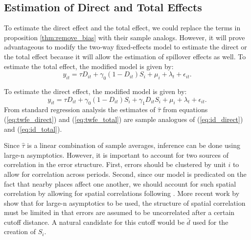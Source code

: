 \documentclass[11pt]{article}
\begin{document}
\subsection{Estimation of Direct and Total Effects}

To estimate the direct effect and the total effect, we could replace the terms in proposition \ref{thm:remove_bias} with their sample analogs. However, it will prove advantageous to modify the two-way fixed-effects model to estimate the direct or the total effect because it will allow the estimation of spillover effects as well. To estimate the total effect, the modified model is given by: 
\begin{equation}\label{eq:twfe_total}    
    y_{it} = \tau D_{it} + \gamma_{0} (1-D_{it}) S_{i} + \mu_i + \lambda_t + \epsilon_{it}.
\end{equation}

To estimate the direct effect, the modified model is given by:
\begin{equation}\label{eq:twfe_direct}    
    y_{it} = \tau D_{it} + \gamma_0 (1-D_{it}) S_{i} + \gamma_1 D_{it} S_{i} +  \mu_i + \lambda_t + \epsilon_{it}.
\end{equation}
From standard regression analysis the estimates of $\hat{\tau}$ from equations (\ref{eq:twfe_direct}) and (\ref{eq:twfe_total}) are sample analogues of (\ref{eq:id_direct}) and (\ref{eq:id_total}).

Since $\hat{\tau}$ is a linear combination of sample averages, inference can be done using large-n asymptotics. However, it is important to account for two sources of correlation in the error structure. First, errors should be clustered by unit $i$ to allow for correlation across periods. Second, since our model is predicated on the fact that nearby places affect one another, we should account for such spatial correlation by allowing for spatial correlations following \citet{Conley_1999}. More recent work by \citet{Ferman_2020} show that for large-n asymptotics to be used, the structure of spatial correlation must be limited in that errors are assumed to be uncorrelated after a certain cutoff distance. A natural candidate for this cutoff would be $\bar{d}$ used for the creation of $S_i$. 
\end{document}
